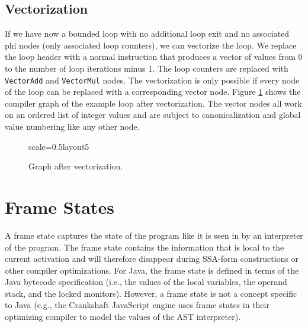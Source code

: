 \documentclass[twocolumn]{svjour3}
\begin{document}
\subsection{Vectorization}

If we have now a bounded loop with no additional loop exit and no associated phi nodes (only associated loop counters), we can vectorize the loop.
We replace the loop header with a normal instruction that produces a vector of values from 0 to the number of loop iterations minus 1.
The loop counters are replaced with \texttt{VectorAdd} and \texttt{VectorMul} nodes.
The vectorization is only possible if every node of the loop can be replaced with a corresponding vector node.
Figure \ref{fig:loop5} shows the compiler graph of the example loop after vectorization.
The vector nodes all work on an ordered list of integer values and are subject to canonicalization and global value numbering like any other node.


\begin{figure}[h]
  \centering
\begin{digraphenv}{scale=0.5}{layout5}
\end{digraphenv}
  \caption{Graph after vectorization.}
  \label{fig:loop5}
\end{figure}


\section{Frame States}
A frame state captures the state of the program like it is seen in by an interpreter of the program.
The frame state contains the information that is local to the current activation and will therefore disappear during SSA-form constructions or other compiler optimizations.
For Java, the frame state is defined in terms of the Java bytecode specification (i.e., the values of the local variables, the operand stack, and the locked monitors).
However, a frame state is not a concept specific to Java (e.g., the Crankshaft JavaScript engine uses frame states in their optimizing compiler to model the values of the AST interpreter).
\end{document}
